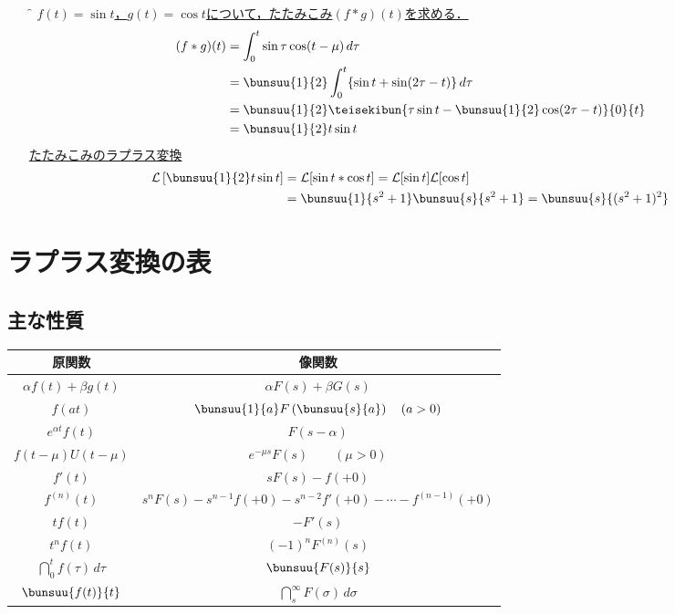 \begin{enumerate}[leftmargin=18pt, labelsep=10pt, itemindent=9pt]
	\item[\f{例}] \underline{$f(t) = \sin t$，$g(t) = \cos t$について，たたみこみ$(f * g)(t)$を求める．}
		\begin{align*}
			(f * g)(t) &= \int_{0}^{t} \sin \tau \cos(t - \mu)\,d\tau\\
			&= \bunsuu{1}{2}\int_{0}^{t} \{\sin t + \sin(2\tau - t)\}\,d\tau\\
			&= \bunsuu{1}{2}\teisekibun{\tau\sin t - \bunsuu{1}{2}\cos(2\tau - t)}{0}{t}\\
			&= \bunsuu{1}{2}t\sin t
		\end{align*}
		\underline{たたみこみのラプラス変換}
		\begin{align*}
			\mathcal{L}\left[\bunsuu{1}{2}t\sin t\right] &= \mathcal{L}[\sin t * \cos t] = \mathcal{L}[\sin t]\mathcal{L}[\cos t]\\
			&= \bunsuu{1}{s^2 + 1}\bunsuu{s}{s^2 + 1} = \bunsuu{s}{(s^2 + 1)^2}
		\end{align*}
\end{enumerate}



\section{ラプラス変換の表}
\subsection{主な性質}

\begin{table}[H]
	\centering
	\begin{tabular}{c|c}
		\hline
		\textsf{原関数} & \textsf{像関数}\\
		\hline
		$\alpha f(t) + \beta g(t)$ & $\alpha F(s) + \beta G(s)$\\[3mm]
		$f(at)$ & $\bunsuu{1}{a}F\left(\bunsuu{s}{a}\right) \quad (a > 0)$\\[3mm]
		$e^{\alpha t}f(t)$ & $F(s - \alpha)$\\[3mm]
		$f(t - \mu)U(t - \mu)$ & $e^{-\mu s} F(s) \qquad (\mu > 0)$\\[3mm]
		$f'(t)$ & $s F(s) - f(+0)$\\[3mm]
		$f^{(n)}(t)$ & $s^n F(s) - s^{n - 1}f(+0) - s^{n - 2}f'(+0) - \cdots - f^{(n - 1)}(+0)$\\[3mm]
		$tf(t)$ & $-F'(s)$\\[3mm]
		$t^n f(t)$ & $(-1)^n F^{(n)}(s)$\\[3mm]
		$\dint_{0}^{t} f(\tau)\,d\tau$ & $\bunsuu{F(s)}{s}$\\[3mm]
		$\bunsuu{f(t)}{t}$ & $\dint_{s}^{\infty} F(\sigma)\,d\sigma$\\[3mm]
		\hline
	\end{tabular}
\end{table}



